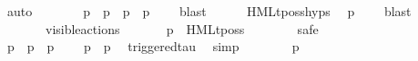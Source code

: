 \begin{isabellebody}
\ auto\isanewline
\ \ \ \ \isamarkupfalse%
\ \isamarkupfalse%
\ p{\isacharprime}{\kern0pt}\ \ {\isacartoucheopen}p\ {\isasymlongmapsto}{\isasymalpha}\ p{\isacharprime}{\kern0pt}\ {\isasymand}\ p{\isacharprime}{\kern0pt}\ {\isasymTTurnstile}\ {\isasymphi}{\isacartoucheclose}\ \isamarkupfalse%
\ blast\isanewline
\ \ \ \ \isamarkupfalse%
\ HMLt{\isacharunderscore}{\kern0pt}poss{\isachardot}{\kern0pt}hyps\ \isamarkupfalse%
\ {\isacartoucheopen}{\isasymtheta}{\isacharparenleft}{\kern0pt}p{\isacharprime}{\kern0pt}{\isacharparenright}{\kern0pt}\ {\isasymTurnstile}\ {\isasymsigma}{\isacharparenleft}{\kern0pt}{\isasymphi}{\isacharparenright}{\kern0pt}{\isacartoucheclose}\ \isamarkupfalse%
\ blast\isanewline
\isanewline
\ \ \ \ \isamarkupfalse%
\ {\isacartoucheopen}{\isasymalpha}\ {\isacharequal}{\kern0pt}\ {\isasymtau}\ {\isasymor}\ {\isasymalpha}\ {\isasymin}\ visible{\isacharunderscore}{\kern0pt}actions{\isacartoucheclose}\ \isanewline
\ \ \ \ \isamarkupfalse%
\ {\isacartoucheopen}{\isasymtheta}{\isacharparenleft}{\kern0pt}p{\isacharparenright}{\kern0pt}\ {\isasymTurnstile}\ {\isasymsigma}{\isacharparenleft}{\kern0pt}HMLt{\isacharunderscore}{\kern0pt}poss\ {\isasymalpha}\ {\isasymphi}{\isacharparenright}{\kern0pt}{\isacartoucheclose}\isanewline
\ \ \ \ \isamarkupfalse%
\ safe\isanewline
\ \ \ \ \ \ \isamarkupfalse%
\ {\isacartoucheopen}{\isasymalpha}\ {\isacharequal}{\kern0pt}\ {\isasymtau}{\isacartoucheclose}\isanewline
\ \ \ \ \ \ \isamarkupfalse%
\ {\isacartoucheopen}p\ {\isasymlongmapsto}{\isasymalpha}\ p{\isacharprime}{\kern0pt}\ {\isasymand}\ p{\isacharprime}{\kern0pt}\ {\isasymTTurnstile}\ {\isasymphi}{\isacartoucheclose}\ \isamarkupfalse%
\ {\isacartoucheopen}{\isasymtheta}{\isacharparenleft}{\kern0pt}p{\isacharparenright}{\kern0pt}\ {\isasymlongmapsto}\isactrlsup {\isasymtheta}{\isasymtau}\ {\isasymtheta}{\isacharparenleft}{\kern0pt}p{\isacharprime}{\kern0pt}{\isacharparenright}{\kern0pt}{\isacartoucheclose}\ \isamarkupfalse%
\ triggered{\isacharunderscore}{\kern0pt}tau\ \isamarkupfalse%
\ simp\isanewline
\ \ \ \ \ \ \isamarkupfalse%
\ {\isacartoucheopen}{\isasymtheta}{\isacharparenleft}{\kern0pt}p{\isacharprime}{\kern0pt}{\isacharparenright}{\kern0pt}\ {\isasymTurnstile}\ {\isasymsigma}{\isacharparenleft}{\kern0pt}{\isasymphi}{\isacharparenright}{\kern0pt}{\isacartoucheclose}\ \isamarkupfalse%

\end{isabellebody}

